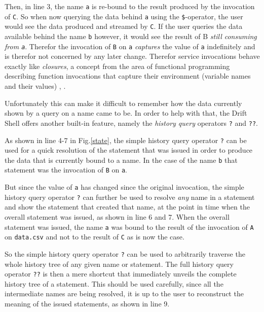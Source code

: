 Then, in line 3, the name \texttt{a} is re-bound to the result
produced by the invocation of \texttt{C}. So when now querying
the data behind \texttt{a} using the \texttt{\$}-operator, the
user would see the data produced and streamed by \texttt{C}.
If the user queries the data available behind the name \texttt{b}
however, it would see the result of B \textit{still consuming
from \texttt{a}}. Therefor the invocation of \texttt{B} on \texttt{a}
\textit{captures} the value of \texttt{a} indefinitely and is therefor
not concerned by any later change. Therefor service invocations
behave exactly like \textit{closures}, a concept from the area of
functional programming describing function invocations that capture
their environment (variable names and their values) \cite{closure},
\cite{closurewiki}.
\newline

Unfortunately this can make it difficult to remember how the data
currently shown by a query on a name came to be.
In order to help with that, the Drift Shell offers another built-in
feature, namely the \textit{history query} operators \texttt{?} and
\texttt{??}.

As shown in line 4-7 in Fig.\ref{state}, the simple history query
operator \texttt{?} can be used for a quick resolution of the
statement that was issued in order to produce the data that is
currently bound to a name. In the case of the name \texttt{b}
that statement was the invocation of \texttt{B} on \texttt{a}.

But since the value of \texttt{a} has changed since the original
invocation, the simple history query operator \texttt{?} can further
be used to resolve \textit{any} name in a statement and show the
statement that created that name, at the point in time when the
overall statement was issued, as shown in line 6 and 7. When
the overall statement was issued, the name \texttt{a} was bound
to the result of the invocation of \texttt{A} on \texttt{data.csv}
and not to the result of \texttt{C} as is now the case.

So the simple history query operator \texttt{?} can be used to
arbitrarily traverse the whole history tree of any given name
or statement. The full history query operator \texttt{??} is then
a mere shortcut that immediately unveils the complete history tree
of a statement. This should be used carefully, since
all the intermediate names are being resolved, it is up to the
user to reconstruct the meaning of the issued statements, as shown
in line 9.
\newline

